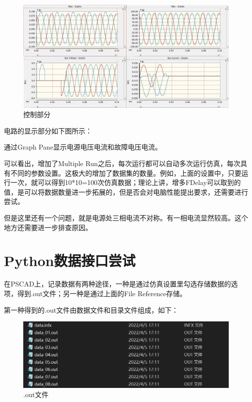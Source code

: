 \documentclass{article}
\begin{document}
{	\begin{figure}[htpb]
		\centering 
		\includegraphics[width=12cm]{figure/3.png}
		\caption{控制部分}
	\end{figure}
	
	电路的显示部分如下图所示：

	通过Graph Pane显示电源电压电流和故障电压电流。
	
	可以看出，增加了Multiple Run之后，每次运行都可以自动多次运行仿真，每次具有不同的参数设置。这极大的增加了数据集的数量。例如，上面的设置中，只要运行一次，就可以得到10*10=100次仿真数据；理论上讲，增多FDelay可以取到的值，是可以将数据数量进一步拓展的，但是否会对电脑性能提出要求，还需要进行尝试。
	
	但是这里还有一个问题，就是电源处三相电流不对称。有一相电流显然较高。这个地方还需要进一步排查原因。
	
	\section{Python数据接口尝试}
	
	在PSCAD上，记录数据有两种途径，一种是通过仿真设置里勾选存储数据的选项，得到.out文件；另一种是通过上面的File Reference存储。
	
	第一种得到的.out文件由数据文件和目录文件组成，如下：
	
	\begin{figure}[htpb]
		\centering 
		\includegraphics[width=12cm]{figure/4.png}
		\caption{.out文件}
	\end{figure}

}
\end{document}
